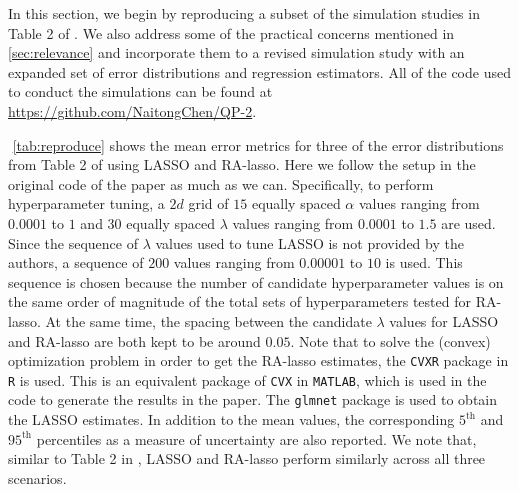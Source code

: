 In this section, we begin by reproducing a subset of the simulation studies in Table 2 of \citet{fan2017estimation}. We also address some of the practical concerns mentioned in \cref{sec:relevance} and incorporate them to a revised simulation study with an expanded set of error distributions and regression estimators. All of the code used to conduct the simulations can be found at \url{https://github.com/NaitongChen/QP-2}.

$ $\newline
\cref{tab:reproduce} shows the mean error metrics for three of the error distributions from Table 2 of \citet{fan2017estimation} using LASSO and RA-lasso. Here we follow the setup in the original code of the paper as much as we can. Specifically, to perform hyperparameter tuning, a $2d$ grid of $15$ equally spaced $\alpha$ values ranging from $0.0001$ to $1$ and $30$ equally spaced $\lambda$ values ranging from $0.0001$ to $1.5$ are used. Since the sequence of $\lambda$ values used to tune LASSO is not provided by the authors, a sequence of $200$ values ranging from $0.00001$ to $10$ is used. This sequence is chosen because the number of candidate hyperparameter values is on the same order of magnitude of the total sets of hyperparameters tested for RA-lasso. At the same time, the spacing between the candidate $\lambda$ values for LASSO and RA-lasso are both kept to be around $0.05$. Note that to solve the (convex) optimization problem in order to get the RA-lasso estimates, the \texttt{CVXR} package in \texttt{R} is used. This is an equivalent package of \texttt{CVX} in \texttt{MATLAB}, which is used in the code to generate the results in the paper. The \texttt{glmnet} package is used to obtain the LASSO estimates. In addition to the mean values, the corresponding $5^\text{th}$ and $95^\text{th}$ percentiles as a measure of uncertainty are also reported. We note that, similar to Table 2 in \citet{fan2017estimation}, LASSO and RA-lasso perform similarly across all three scenarios.

